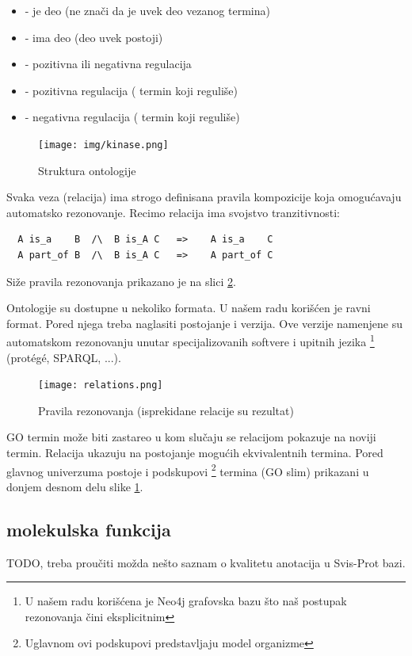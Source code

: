 \begin{itemize}
  \item {}  - je deo  (ne znači da je uvek deo vezanog termina)
  \item {} - ima deo (deo uvek postoji)
  \item {} - pozitivna ili negativna regulacija
  \item {} - pozitivna regulacija  
    ( termin koji reguliše)
  \item {} - negativna regulacija 
    ( termin koji reguliše)
\end{itemize}

\begin{figure}[h!]
  \centering
  \texttt{[image: img/kinase.png]}
  \caption{Struktura ontologije}
  \label{fig:kinase}
\end{figure}

Svaka veza (relacija) ima strogo definisana pravila kompozicije koja omogućavaju
automatsko rezonovanje. Recimo relacija  ima svojstvo
tranzitivnosti\parencite{is_a}:
\begin{verbatim}
  A is_a    B  /\  B is_A C   =>    A is_a    C           
  A part_of B  /\  B is_A C   =>    A part_of C
\end{verbatim}

Siže pravila rezonovanja prikazano je na slici \ref{fig:relations}.

Ontologije su dostupne u nekoliko formata. U našem radu korišćen je ravni
 format.  Pored njega treba naglasiti postojanje  i
 verzija.  Ove verzije namenjene su automatskom rezonovanju unutar
specijalizovanih softvere i upitnih jezika \footnote{U našem radu korišćena je
Neo4j grafovska bazu što naš postupak rezonovanja čini eksplicitnim} (protégé,
SPARQL, ...).

\begin{figure}[h!]
  \centering
  \texttt{[image: relations.png]}
  \caption{Pravila rezonovanja (isprekidane relacije su rezultat)}
  \label{fig:relations}
\end{figure}

GO termin može biti zastareo u kom slučaju se relacijom 
pokazuje na noviji termin. Relacija  ukazuju na
postojanje mogućih ekvivalentnih termina. Pored glavnog univerzuma postoje i
podskupovi \footnote{Uglavnom ovi podskupovi predstavljaju model organizme}
termina (GO slim) prikazani u donjem desnom delu slike \ref{fig:kinase}.


\subsection{molekulska funkcija}
TODO, treba proučiti \parencite{go_mf} možda nešto saznam o kvalitetu anotacija
u Svis-Prot bazi.










